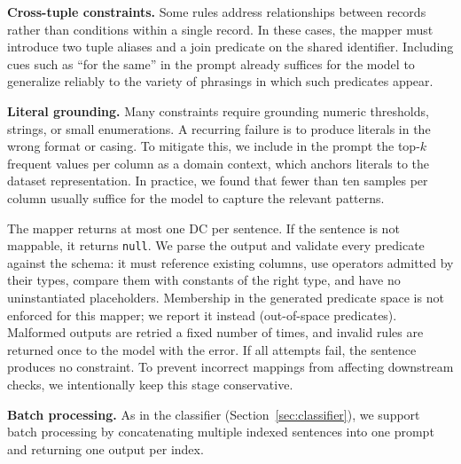 \smallskip\noindent\textbf{Cross-tuple constraints.}
Some rules address relationships between records rather than conditions 
within a single record. In these cases, the mapper must introduce two 
tuple aliases and a join predicate on the shared identifier.%
Including cues such as ``for the same'' in the prompt
already suffices for the model to generalize reliably to the variety of phrasings in which such predicates appear.


\smallskip\noindent\textbf{Literal grounding.}
Many constraints require grounding numeric thresholds, strings, or small 
enumerations. A recurring failure is to produce literals in the wrong 
format or casing. To mitigate this, we include in the prompt the top-$k$ 
frequent values per column as a domain context, which anchors 
literals to the dataset representation. In practice, we found that fewer than ten 
samples per column usually suffice for the model to capture the relevant patterns.

The mapper returns at most one DC per sentence. If the sentence is not mappable, it returns \texttt{null}. We parse the output and validate every predicate against the schema: it must reference existing columns, use operators admitted by their types, compare them with constants of the right type, and have no uninstantiated placeholders. Membership in the generated predicate space is not enforced for this mapper; we report it instead (out-of-space predicates). Malformed outputs are retried a fixed number of times, and invalid rules are returned once to the model with the error. If all attempts fail, the sentence produces no constraint. To prevent incorrect mappings from affecting downstream checks, we intentionally keep this stage conservative.


\smallskip\noindent\textbf{Batch processing.}
As in the classifier (Section~\ref{sec:classifier}), we support batch processing by concatenating multiple indexed sentences into one prompt and returning one output per index. 

